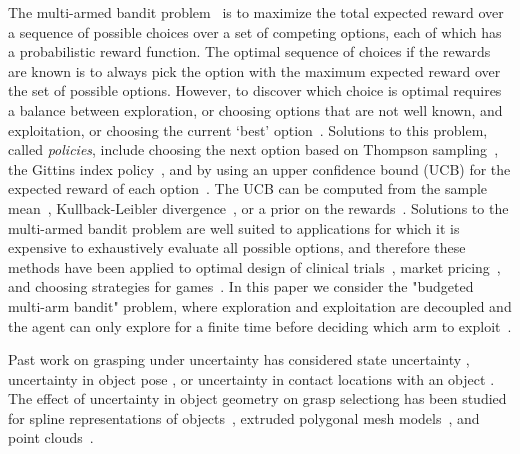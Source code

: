 \documentclass[letterpaper, 10 pt, conference]{ieeeconf}  %
\begin{document}
The multi-armed bandit problem~\cite{barto1998reinforcement, lai1985asymptotically, robbins1985some} is to maximize the total expected reward over a sequence of possible choices over a set of competing options, each of which has a probabilistic reward function.
The optimal sequence of choices if the rewards are known is to always pick the option with the maximum expected reward over the set of possible options.
However, to discover which choice is optimal requires a balance between exploration, or choosing options that are not well known, and exploitation, or choosing the current `best' option~\cite{barto1998reinforcement}.
Solutions to this problem, called {\it policies}, include choosing the next option based on Thompson sampling~\cite{agrawal2011analysis}, the Gittins index policy~\cite{weber1992gittins}, and by using an upper confidence bound (UCB) for the expected reward of each option~\cite{auer2002finite}.
The UCB can be computed from the sample mean~\cite{agrawal1995sample}, Kullback-Leibler divergence~\cite{cappe2013kullback}, or a prior on the rewards~\cite{kaufmann2012bayesian}.
Solutions to the multi-armed bandit problem are well suited to applications for which it is expensive to exhaustively evaluate all possible options, and therefore these methods have been applied to optimal design of clinical trials~\cite{simon1989optimal}, market pricing~\cite{rothschild1974two}, and choosing strategies for games~\cite{st2012online}.
In this paper we consider the "budgeted multi-arm bandit" problem, where exploration and exploitation are decoupled and the agent can only explore for a finite time before deciding which arm to exploit~\cite{madani2004budgeted}.

Past work on grasping under uncertainty has considered state uncertainty \cite{goldberg1990bayesian, stulp2011learning},  uncertainty in object pose \cite{christopoulos2007handling, weisz2012pose, kim2012physically}, or uncertainty in contact locations with an object \cite{zheng2005}.
The effect of uncertainty in object geometry on grasp selectiong has been studied for spline representations of objects~\cite{christopoulos2007handling}, extruded polygonal mesh models~\cite{kehoe2012estimating, kehoe2012toward}, and point clouds~\cite{hsiao2011bayesian}.
\end{document}
